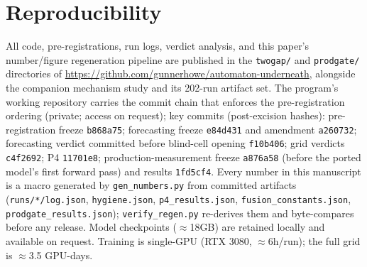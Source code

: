 \documentclass[10pt]{article}
\begin{document}
\section{Reproducibility}\label{sec:repro}
All code, pre-registrations, run logs, verdict analysis, and this paper's number/figure
regeneration pipeline are published in the \texttt{twogap/} and \texttt{prodgate/} directories of
\url{https://github.com/gunnerhowe/automaton-underneath}, alongside the companion mechanism
study and its 202-run artifact set. The program's working repository carries the commit chain that
enforces the pre-registration ordering (private; access on request); key commits (post-excision
hashes): pre-registration freeze \texttt{b868a75}; forecasting freeze \texttt{e84d431} and
amendment \texttt{a260732}; forecasting verdict committed before blind-cell opening
\texttt{f10b406}; grid verdicts \texttt{c4f2692}; P4 \texttt{11701e8}; production-measurement
freeze \texttt{a876a58} (before the ported model's first forward pass) and results
\texttt{1fd5cf4}. Every number in this manuscript is a macro generated by
\texttt{gen\_numbers.py} from committed artifacts (\texttt{runs/*/log.json},
\texttt{hygiene.json}, \texttt{p4\_results.json}, \texttt{fusion\_constants.json},
\texttt{prodgate\_results.json}); \texttt{verify\_regen.py} re-derives them and byte-compares
before any release. Model checkpoints ($\approx$18GB) are retained locally and available on
request. Training is single-GPU (RTX 3080, $\approx$6h/run); the full grid is $\approx$3.5
GPU-days.



\end{document}
